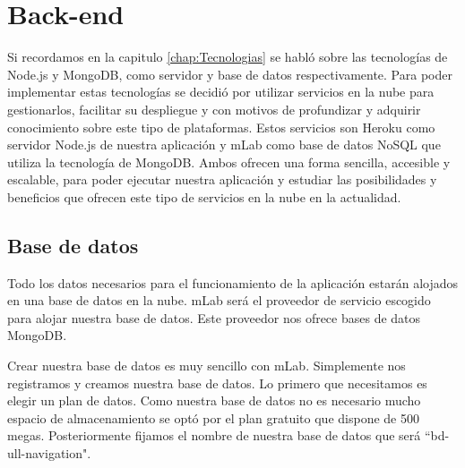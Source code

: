 %
%
%  
  
  
\chapter{Back-end} \label{chap:BackEnd} 

Si recordamos en la capitulo \ref{chap:Tecnologias} se habló sobre las tecnologías de Node.js y MongoDB, como servidor y base de datos respectivamente. Para poder implementar estas tecnologías se decidió por utilizar servicios en la nube para gestionarlos, facilitar su despliegue y con motivos de profundizar y adquirir conocimiento sobre este tipo de plataformas. Estos servicios son Heroku como servidor Node.js de nuestra aplicación y mLab como base de datos NoSQL que utiliza la tecnología de MongoDB. Ambos ofrecen una forma sencilla, accesible y escalable, para poder ejecutar nuestra aplicación y estudiar las posibilidades y beneficios que ofrecen este tipo de servicios en la nube en la actualidad.

\section{Base de datos}

Todo los datos necesarios para el funcionamiento de la aplicación estarán alojados en una base de datos en la nube. mLab será el proveedor de servicio escogido para alojar nuestra base de datos. Este proveedor nos ofrece bases de datos MongoDB.

Crear nuestra base de datos es muy sencillo con mLab. Simplemente nos registramos y creamos nuestra base de datos. Lo primero que necesitamos es elegir un plan de datos. Como nuestra base de datos no es necesario mucho espacio de almacenamiento se optó por el plan gratuito que dispone de 500 megas. Posteriormente fijamos el nombre de nuestra base de datos que será ``bd-ull-navigation".



